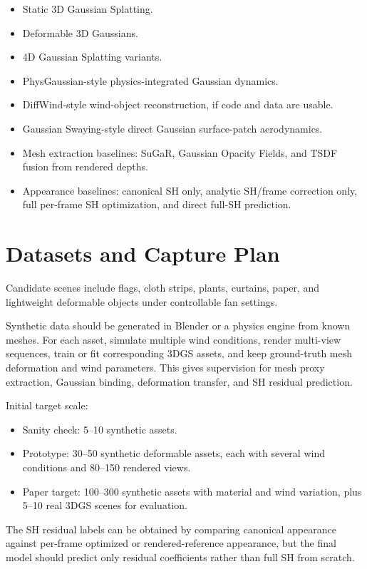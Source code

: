 \documentclass[11pt]{article}
\begin{document}
\begin{itemize}
  \item Static 3D Gaussian Splatting.
  \item Deformable 3D Gaussians.
  \item 4D Gaussian Splatting variants.
  \item PhysGaussian-style physics-integrated Gaussian dynamics.
  \item DiffWind-style wind-object reconstruction, if code and data are usable.
  \item Gaussian Swaying-style direct Gaussian surface-patch aerodynamics.
  \item Mesh extraction baselines: SuGaR, Gaussian Opacity Fields, and TSDF fusion from rendered depths.
  \item Appearance baselines: canonical SH only, analytic SH/frame correction only, full per-frame SH optimization, and direct full-SH prediction.
\end{itemize}

\section{Datasets and Capture Plan}

Candidate scenes include flags, cloth strips, plants, curtains, paper, and lightweight deformable objects under controllable fan settings.

Synthetic data should be generated in Blender or a physics engine from known meshes. For each asset, simulate multiple wind conditions, render multi-view sequences, train or fit corresponding 3DGS assets, and keep ground-truth mesh deformation and wind parameters. This gives supervision for mesh proxy extraction, Gaussian binding, deformation transfer, and SH residual prediction.

Initial target scale:

\begin{itemize}
  \item Sanity check: 5--10 synthetic assets.
  \item Prototype: 30--50 synthetic deformable assets, each with several wind conditions and 80--150 rendered views.
  \item Paper target: 100--300 synthetic assets with material and wind variation, plus 5--10 real 3DGS scenes for evaluation.
\end{itemize}

The SH residual labels can be obtained by comparing canonical appearance against per-frame optimized or rendered-reference appearance, but the final model should predict only residual coefficients rather than full SH from scratch.
\end{document}
